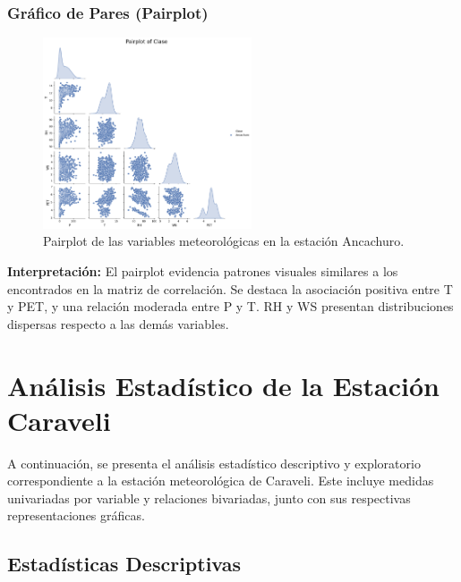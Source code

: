 \subsubsection*{Gráfico de Pares (Pairplot)}
\begin{figure}[H]
\centering
\includegraphics[width=0.55\textwidth]{resultados/por_estacion_meteorologica/Ancachuro/pairplot.png}
\caption{Pairplot de las variables meteorológicas en la estación Ancachuro.}
\label{fig:ancachuro_pairplot}
\end{figure}
\textbf{Interpretación:} El pairplot evidencia patrones visuales similares a los encontrados en la matriz de correlación. Se destaca la asociación positiva entre T y PET, y una relación moderada entre P y T. RH y WS presentan distribuciones dispersas respecto a las demás variables.





\section{Análisis Estadístico de la Estación Caraveli}

A continuación, se presenta el análisis estadístico descriptivo y exploratorio correspondiente a la estación meteorológica de Caraveli. Este incluye medidas univariadas por variable y relaciones bivariadas, junto con sus respectivas representaciones gráficas.

\subsection{Estadísticas Descriptivas}

